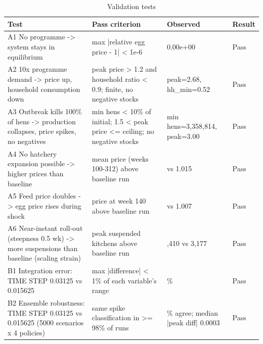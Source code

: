 \documentclass[10pt,twocolumn,a4paper]{article}
\begin{document}
\begin{table}[!t]
\centering
\scriptsize
\caption{Validation tests}\label{tab:val}
\begin{tabularx}{\linewidth}{>{\raggedright\arraybackslash}X>{\raggedright\arraybackslash}X>{\raggedright\arraybackslash}p{3.2cm}l}
\toprule
\textbf{Test} & \textbf{Pass criterion} & \textbf{Observed} & \textbf{Result} \\
\midrule
A1 No programme -\textgreater{} system stays in equilibrium & max |relative egg price - 1| \textless{} 1e-6 & 0.00e+00 & Pass \\
A2 10x programme demand -\textgreater{} price up, household consumption down & peak price \textgreater{} 1.2 and household ratio \textless{} 0.9; finite, no negative stocks & peak=2.68, hh\_min=0.52 & Pass \\
A3 Outbreak kills 100\% of hens -\textgreater{} production collapses, price spikes, no negatives & min hens \textless{} 10\% of initial; 1.5 \textless{} peak price \textless{}= ceiling; no negative stocks & min hens=3,358,814, peak=3.00 & Pass \\
A4 No hatchery expansion possible -\textgreater{} higher prices than baseline & mean price (weeks 100-312) above baseline run & 1.118 vs 1.015 & Pass \\
A5 Feed price doubles -\textgreater{} egg price rises during shock & price at week 140 above baseline run & 1.090 vs 1.007 & Pass \\
A6 Near-instant roll-out (steepness 0.5 wk) -\textgreater{} more suspensions than baseline (scaling strain) & peak suspended kitchens above baseline run & 5,410 vs 3,177 & Pass \\
B1 Integration error: TIME STEP 0.03125 vs 0.015625 & max |difference| \textless{} 1\% of each variable's range & 0.6328\% & Pass \\
B2 Ensemble robustness: TIME STEP 0.03125 vs 0.015625 (5000 scenarios x 4 policies) & same spike classification in \textgreater{}= 98\% of runs & 99.7\% agree; median |peak diff| 0.0003 & Pass \\
\bottomrule
\end{tabularx}
\end{table}
\end{document}

